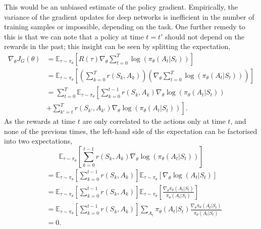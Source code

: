 This would be an unbiased estimate of the policy gradient. Empirically, the variance of the gradient updates for deep networks is inefficient in the number of training samples or impossible, depending on the task. One further remedy to this is that we can note that a policy at time $t = t'$ should not depend on the rewards in the past; this insight can be seen by splitting the expectation,
\begin{align}
	\nabla_{\theta} J_G(\theta) & = \mathbb{E}_{\tau \sim \pi_{\theta}} \left[ R(\tau) \nabla_\theta \sum_{t=0}^ T \log(\pi_\theta(A_t|S_t))\right]                                               \\
	                            & = \mathbb{E}_{\tau \sim \pi_{\theta}} \left[ \left(\sum_{k = 0}^T r(S_k, A_k)\right) \left(\nabla_\theta \sum_{t=0}^ T \log(\pi_\theta(A_t|S_t))\right) \right] \\
	                            & = \sum_{t = 0} ^T \mathbb{E}_{\tau \sim \pi_\theta} \left[ \sum_{k = 0} ^ {t-1} r(S_k, A_k) \nabla_\theta \log(\pi_\theta(A_t|S_t)) \right.                     \\
	                            & \left. + \sum_{k' = t} ^ T r(S_{k'}, A_{k'}) \nabla_\theta \log(\pi_\theta(A_t| S_t)) \right ]. \label{causal_expect}
\end{align}
As the rewards at time $t$ are only correlated to the actions only at time $t$, and none of the previous times, the left-hand side of the expectation can be factorised into two expectations,
\begin{equation}
	\mathbb{E}_{\tau \sim \pi_\theta} \left[ \sum_{k = 0} ^ {t-1} r(S_k, A_k) \nabla_\theta \log(\pi_\theta(A_t|S_t))\right]
\end{equation}
\begin{align*}
	 & = \mathbb{E}_{\tau \sim \pi_\theta} \left[ \sum_{k=0}^{t-1}r(S_k, A_k)\right] \mathbb{E}_{\tau \sim \pi_\theta} \left[ \nabla_\theta \log(A_t| S_t) \right]                                                                 \\
	 & = \mathbb{E}_{\tau \sim \pi_\theta} \left[ \sum_{k=0}^{t-1}r(S_k, A_k)\right] \mathbb{E}_{\tau \sim \pi_\theta} \left[ \frac{\nabla_\theta \pi_\theta(A_t| S_t)}{\pi_\theta(A_t| S_t)} \right] \label{score_function_lemma} \\
	 & = \mathbb{E}_{\tau \sim \pi_\theta} \left[ \sum_{k=0}^{t-1}r(S_k, A_k)\right] \sum_{A_t} \pi_\theta(A_t|S_t)\frac{\nabla_\theta \pi_\theta(A_t| S_t)}{\pi_\theta(A_t| S_t)}                                                 \\
	 & = 0.
\end{align*}
